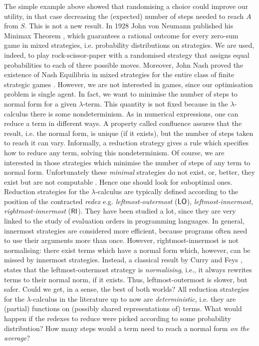 The simple example above showed that randomising a choice could improve our utility, in that case decreasing the (expected) number of steps needed to reach $A$ from $S$. This is not a new result. In 1928 John von Neumann published his Minimax Theorem \cite{von_neumann_zur_1928}, which guarantees a rational outcome for every zero-sum game in mixed strategies, i.e. probability distributions on strategies. We are used, indeed, to play rock-scissor-paper with a randomised strategy that assigns equal probabilities to each of three possible moves. Moreover, John Nash proved the existence of Nash Equilibria in mixed strategies for the entire class of finite strategic games \cite{nash_equilibrium_1950}. However, we are not interested in games, since our optimisation problem is single agent. In fact, we want to minimise the number of steps to normal form for a given $\lambda$-term. This quantity is not fixed because in the $\lambda$-calculus there is some nondeterminism. As in numerical expressions, one can reduce a term in different ways. A property called confluence assures that the result, i.e. the normal form, is unique (if it exists), but the number of steps taken to reach it can vary. Informally, a reduction strategy gives a rule which specifies how to reduce any term, solving this nondeterminism. Of course, we are interested in those strategies which minimise the number of steps of any term to normal form. Unfortunately these \emph{minimal} strategies do not exist, or, better, they exist but are not computable \cite{barendregt_lambda_1984}. Hence one should look for suboptimal ones. Reduction strategies for
the $\lambda$-calculus are typically defined according to the position
of the contracted \emph{redex} e.g. \emph{leftmost-outermost} ($\textsf{LO}$),
\emph{leftmost-innermost}, \emph{rightmost-innermost} ($\textsf{RI}$). They have been studied a lot, since they are very linked to the study of evaluation orders in programming languages.
In general, innermost strategies are considered more efficient, because
programs often need to use their arguments more than once. However, rightmost-innermost is not normalising: there
exist terms which have a normal form which, however, can be missed by
innermost strategies. Instead, a classical result by Curry and Feys
\cite{curry_combinatory_1958}, states that the leftmost-outermost strategy is
\emph{normalising}, i.e., it always rewrites terms to their normal
norm, if it exists. Thus, leftmost-outermost is slower, but
safer. Could we get, in a sense, the best of both worlds?  All
reduction strategies for the $\lambda$-calculus in the literature up
to now are \emph{deterministic}, i.e. they are (partial) functions on
(possibly shared representations of) terms. What would
happen if the redexes to reduce were picked according to some
probability distribution? How many steps would a term need to reach a
normal form \emph{on the average}?
